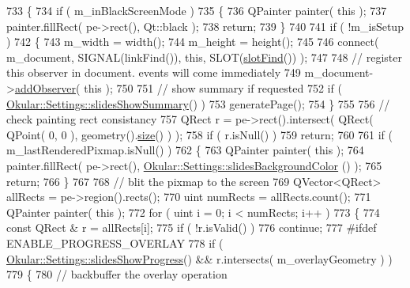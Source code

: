 \begin{DoxyCode}
733 \{
734     \textcolor{keywordflow}{if} ( m\_inBlackScreenMode )
735     \{
736         QPainter painter( \textcolor{keyword}{this} );
737         painter.fillRect( pe->rect(), Qt::black );
738         \textcolor{keywordflow}{return};
739     \}
740 
741     \textcolor{keywordflow}{if} ( !m\_isSetup )
742     \{
743         m\_width = width();
744         m\_height = height();
745 
746         connect( m\_document, SIGNAL(linkFind()), \textcolor{keyword}{this}, SLOT(\hyperlink{classPresentationWidget_a4488b5ed4958497c9c07e9e5478c4b13}{slotFind}()) );
747 
748         \textcolor{comment}{// register this observer in document. events will come immediately}
749         m\_document->\hyperlink{classOkular_1_1Document_a37300860cf93f60184305829b033e0e2}{addObserver}( \textcolor{keyword}{this} );
750 
751         \textcolor{comment}{// show summary if requested}
752         \textcolor{keywordflow}{if} ( \hyperlink{classOkular_1_1Settings_ac06ca89e428ad1ee40753da80a1f35e5}{Okular::Settings::slidesShowSummary}() )
753             generatePage();
754     \}
755 
756     \textcolor{comment}{// check painting rect consistancy}
757     QRect r = pe->rect().intersect( QRect( QPoint( 0, 0 ), geometry().\hyperlink{synctex__parser_8c_aa23c661441688350614bd6a350d2b6ff}{size}() ) );
758     \textcolor{keywordflow}{if} ( r.isNull() )
759         \textcolor{keywordflow}{return};
760 
761     \textcolor{keywordflow}{if} ( m\_lastRenderedPixmap.isNull() )
762     \{
763         QPainter painter( \textcolor{keyword}{this} );
764         painter.fillRect( pe->rect(), \hyperlink{classOkular_1_1Settings_a8a692db67200b9e78363d736dbf4cd5f}{Okular::Settings::slidesBackgroundColor}
      () );
765         \textcolor{keywordflow}{return};
766     \}
767 
768     \textcolor{comment}{// blit the pixmap to the screen}
769     QVector<QRect> allRects = pe->region().rects();
770     uint numRects = allRects.count();
771     QPainter painter( \textcolor{keyword}{this} );
772     \textcolor{keywordflow}{for} ( uint i = 0; i < numRects; i++ )
773     \{
774         \textcolor{keyword}{const} QRect & r = allRects[i];
775         \textcolor{keywordflow}{if} ( !r.isValid() )
776             \textcolor{keywordflow}{continue};
777 \textcolor{preprocessor}{#ifdef ENABLE\_PROGRESS\_OVERLAY}
778         \textcolor{keywordflow}{if} ( \hyperlink{classOkular_1_1Settings_ae6d1c06a5ae4bef003883132a9dc20bd}{Okular::Settings::slidesShowProgress}() && r.intersects( 
      m\_overlayGeometry ) )
779         \{
780             \textcolor{comment}{// backbuffer the overlay operation}

\end{DoxyCode}
